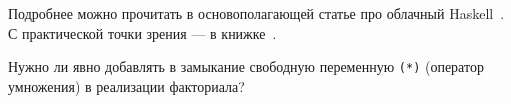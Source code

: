 Подробнее можно прочитать в основополагающей статье про облачный Haskell~\cite{epstein2011towards}.
С практической точки зрения --- в книжке~\cite[глава 16]{marlow2011parallel}.

\begin{task}
    Нужно ли явно добавлять в замыкание свободную переменную \texttt{(*)} (оператор умножения) в реализации факториала?
\end{task}


%
%
%
%
%
%
%
%
%
%
%
%
%
%
%
%
%
%
%
%
%
%
